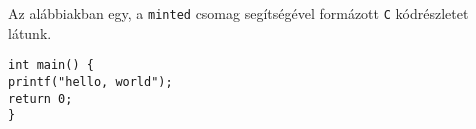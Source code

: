 \documentclass{article}
\begin{document}
	
Az alábbiakban egy, a \texttt{minted} csomag segítségével formázott \texttt{C} kódrészletet látunk.
	
\begin{verbatim}
int main() {
printf("hello, world");
return 0;
}
\end{verbatim}
\end{document}
